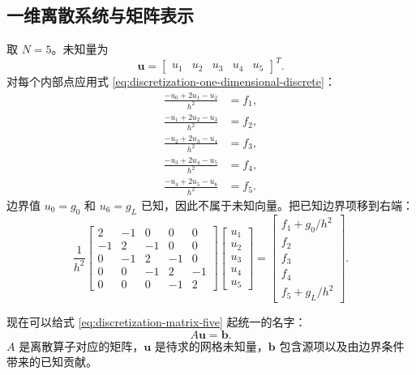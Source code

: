 \subsection{一维离散系统与矩阵表示}

取 $N=5$。未知量为
\begin{equation}
\bm u=
\begin{bmatrix}
u_1&u_2&u_3&u_4&u_5
\end{bmatrix}^T.
\end{equation}
对每个内部点应用式 \eqref{eq:discretization-one-dimensional-discrete}：
\begin{align}
\frac{-u_0+2u_1-u_2}{h^2}&=f_1,\\
\frac{-u_1+2u_2-u_3}{h^2}&=f_2,\\
\frac{-u_2+2u_3-u_4}{h^2}&=f_3,\\
\frac{-u_3+2u_4-u_5}{h^2}&=f_4,\\
\frac{-u_4+2u_5-u_6}{h^2}&=f_5.
\end{align}
边界值 $u_0=g_0$ 和 $u_6=g_L$ 已知，因此不属于未知向量。把已知边界项移到右端：
\begin{equation}
\frac1{h^2}
\begin{bmatrix}
2&-1&0&0&0\\
-1&2&-1&0&0\\
0&-1&2&-1&0\\
0&0&-1&2&-1\\
0&0&0&-1&2
\end{bmatrix}
\begin{bmatrix}
u_1\\u_2\\u_3\\u_4\\u_5
\end{bmatrix}
=
\begin{bmatrix}
f_1+g_0/h^2\\
f_2\\
f_3\\
f_4\\
f_5+g_L/h^2
\end{bmatrix}.
\label{eq:discretization-matrix-five}
\end{equation}

现在可以给式 \eqref{eq:discretization-matrix-five} 起统一的名字：
\begin{equation}
A\bm u=\bm b.
\label{eq:discretization-Aub}
\end{equation}
$A$ 是离散算子对应的矩阵，$\bm u$ 是待求的网格未知量，$\bm b$ 包含源项以及由边界条件带来的已知贡献。

